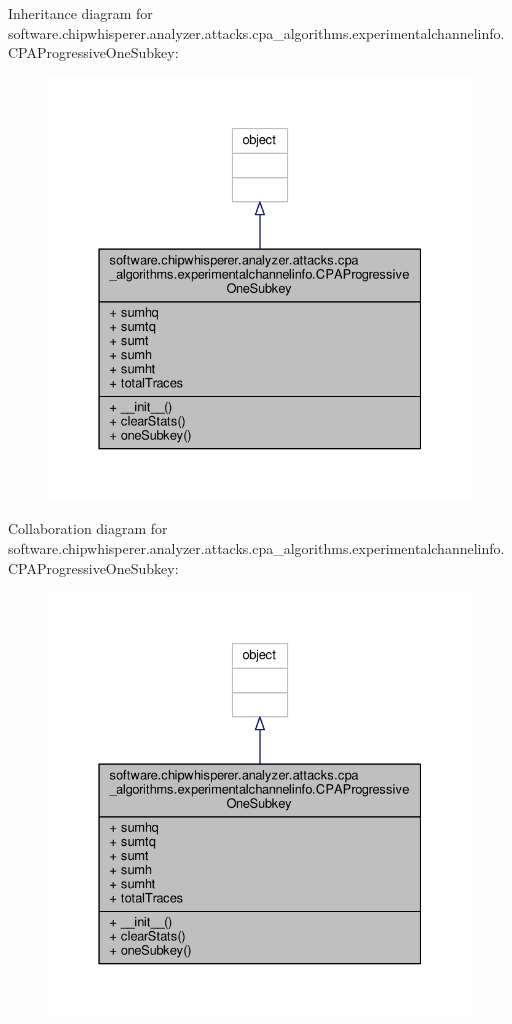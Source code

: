 Inheritance diagram for software.\+chipwhisperer.\+analyzer.\+attacks.\+cpa\+\_\+algorithms.\+experimentalchannelinfo.\+C\+P\+A\+Progressive\+One\+Subkey\+:\nopagebreak
\begin{figure}[H]
\begin{center}
\leavevmode
\includegraphics[width=331pt]{da/db5/classsoftware_1_1chipwhisperer_1_1analyzer_1_1attacks_1_1cpa__algorithms_1_1experimentalchanneli63269ecb8393e2c15ddd62708d03a1f6}
\end{center}
\end{figure}


Collaboration diagram for software.\+chipwhisperer.\+analyzer.\+attacks.\+cpa\+\_\+algorithms.\+experimentalchannelinfo.\+C\+P\+A\+Progressive\+One\+Subkey\+:\nopagebreak
\begin{figure}[H]
\begin{center}
\leavevmode
\includegraphics[width=331pt]{de/d5e/classsoftware_1_1chipwhisperer_1_1analyzer_1_1attacks_1_1cpa__algorithms_1_1experimentalchanneli998be9e6aa964a835579a6e91b7c44e7}
\end{center}
\end{figure}


